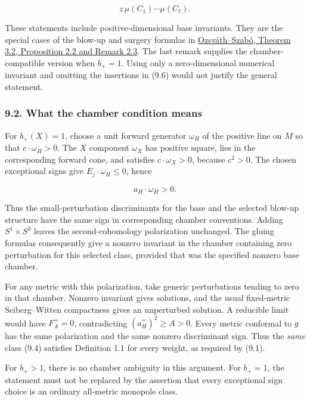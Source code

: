 \documentclass[
  11pt,
]{article}
\begin{document}
\[
                           z\,\mu(C_1)\cdots\mu(C_\ell).
 \tag{9.6}
\]

These statements include positive-dimensional base invariants. They are
the special cases of the blow-up and surgery formulas in
\href{https://arxiv.org/pdf/math/0005268}{Ozsváth--Szabó, Theorem 3.2,
Proposition 2.2 and Remark 2.3}. The last remark supplies the
chamber-compatible version when \(b_+=1\). Using only a zero-dimensional
numerical invariant and omitting the insertions in (9.6) would not
justify the general statement.

\hypertarget{what-the-chamber-condition-means}{%
\subsubsection{9.2. What the chamber condition
means}\label{what-the-chamber-condition-means}}

For \(b_+(X)=1\), choose a unit forward generator \(\omega_H\) of the
positive line on \(M\) so that \(c\cdot\omega_H>0\). The \(X\) component
\(\omega_X\) has positive square, lies in the corresponding forward
cone, and satisfies \(c\cdot\omega_X>0\), because \(c^2>0\). The chosen
exceptional signs give \(E_j\cdot\omega_H\le0\), hence

\[
                          a_H\cdot\omega_H>0.             \tag{9.7}
\]

Thus the small-perturbation discriminants for the base and the selected
blow-up structure have the same sign in corresponding chamber
conventions. Adding \(S^1\times S^3\) leaves the second-cohomology
polarization unchanged. The gluing formulas consequently give a nonzero
invariant in the chamber containing zero perturbation for this selected
class, provided that was the specified nonzero base chamber.

For any metric with this polarization, take generic perturbations
tending to zero in that chamber. Nonzero invariant gives solutions, and
the usual fixed-metric Seiberg--Witten compactness gives an unperturbed
solution. A reducible limit would have \(F_A^+=0\), contradicting
\((a_H^+)^2\ge A>0\). Every metric conformal to \(g\) has the same
polarization and the same nonzero discriminant sign. Thus the
\emph{same} class (9.4) satisfies Definition 1.1 for every weight, as
required by (9.1).

For \(b_+>1\), there is no chamber ambiguity in this argument. For
\(b_+=1\), the statement must not be replaced by the assertion that
every exceptional sign choice is an ordinary all-metric monopole class.
\end{document}

